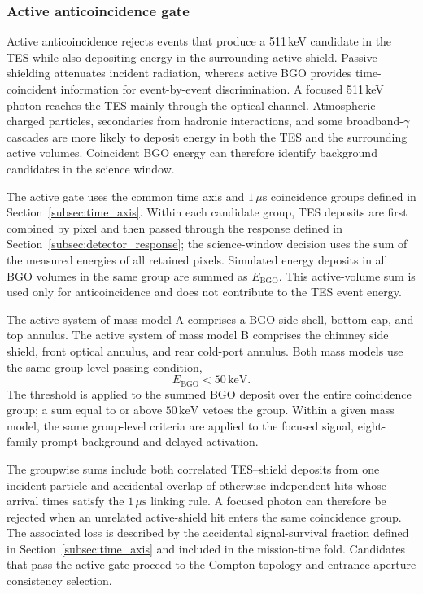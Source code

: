 \documentclass[11pt]{article}
\newcommand{\revblue}[1]{\textcolor{revisionblue}{#1}}
\newcommand{\keV}{\ensuremath{\,\mathrm{keV}}}
\begin{document}
\subsubsection{Active anticoincidence gate}

Active anticoincidence rejects events that produce a 511\,keV candidate in the
TES while also depositing energy in the surrounding active shield. Passive
shielding attenuates incident radiation, whereas active BGO provides
time-coincident information for event-by-event discrimination. A focused
511\,keV photon reaches the TES mainly through the optical channel. Atmospheric
charged particles, secondaries from hadronic interactions, and some
broadband-$\gamma$ cascades are more likely to deposit energy in both the TES
and the surrounding active volumes. Coincident BGO energy can therefore
identify background candidates in the science window.

The active gate uses the common time axis and $1\,\mu\mathrm{s}$ coincidence
groups defined in Section~\ref{subsec:time_axis}. Within each candidate group,
TES deposits are first combined by pixel and then passed through the response
defined in Section~\ref{subsec:detector_response}; the science-window decision
uses the sum of the measured energies of all retained pixels. Simulated energy
deposits in all BGO volumes in the same group are summed as
$E_{\mathrm{BGO}}$. This active-volume sum is used only for anticoincidence and
does not contribute to the TES event energy.

The active system of mass model A comprises a BGO side shell, bottom cap, and
top annulus. The active system of mass model B comprises the chimney side
shield, front optical annulus, and rear cold-port annulus. Both mass models use
the same group-level passing condition,
\[
 E_{\mathrm{BGO}}<50\keV .
\]
The threshold is applied to the summed BGO deposit over the entire coincidence
group; a sum equal to or above $50\keV$ vetoes the group.
Within a given mass model, the same group-level criteria are applied to the
focused signal, \revblue{eight-family prompt background and delayed
activation}.

The groupwise sums include both correlated TES--shield deposits from one
incident particle and accidental overlap of otherwise independent hits whose
arrival times satisfy the $1\,\mu\mathrm{s}$ linking rule. A focused photon can
therefore be rejected when an unrelated active-shield hit enters the same
coincidence group. The associated loss is described by the accidental
signal-survival fraction defined in Section~\ref{subsec:time_axis} and included
in the mission-time fold. Candidates that pass the active gate proceed to the
Compton-topology and entrance-aperture consistency selection.
\end{document}
